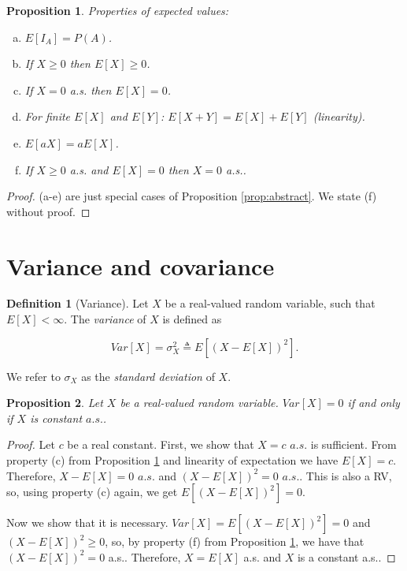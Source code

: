 \documentclass{book}
\theoremstyle{plain}%
\newtheorem{proposition}{Proposition}[section]
\theoremstyle{definition}
\newtheorem{definition}{Definition}[section]
\begin{document}
\begin{proposition}

Properties of expected values:

\begin{enumerate}[(a)]
\item $E[I_A] = P(A)$.
\item If $X \geq 0$ then $E[X] \geq 0$.
\item If $X = 0$ a.s. then $E[X] = 0$.
\item For finite $E[X]$ and $E[Y]$: $E[X+Y] = E[X] + E[Y]$ \emph{(linearity)}.
\item $E[aX] = aE[X]$.
\item If $X \geq 0$ a.s. and $E[X] = 0$ then $X = 0$ a.s..
\end{enumerate}\label{prop:properties_of_expectation}
\end{proposition}

\begin{proof}
(a-e) are just special cases of Proposition \ref{prop:abstract}. We state (f) without proof.
\end{proof}


\section{Variance and covariance}

\begin{definition}[Variance] Let $X$ be a real-valued random variable, such that $E[X] < \infty$.  The \emph{variance} of $X$ is defined as

$$Var[X] = \sigma^2_{X} \triangleq E[(X - E[X])^2].$$

We refer to $\sigma_X$ as the\emph{ standard deviation} of $X$.
\end{definition}

\begin{proposition}
Let $X$ be a real-valued random variable. $Var[X] = 0$ if and only if $X$ is constant $a.s.$.
\end{proposition}

\begin{proof}
Let $c$ be a real constant. First, we show that $X = c$ $a.s.$ is sufficient. From property (c) from Proposition \ref{prop:properties_of_expectation} and linearity of expectation we have $E[X] = c$. Therefore, $X - E[X] = 0$ $a.s.$ and $(X - E[X])^2 = 0$ $a.s.$. This is also a RV, so, using property (c) again, we get $E[(X - E[X])^2] = 0$.

Now we show that it is necessary. $Var[X] = E[(X - E[X])^2] = 0$ and $(X - E[X])^2 \geq 0$, so, by property (f) from Proposition \ref{prop:properties_of_expectation}, we have that $(X - E[X])^2 = 0$ a.s.. Therefore, $X = E[X]$ a.s. and $X$ is a constant a.s..
\end{proof}
\end{document}
